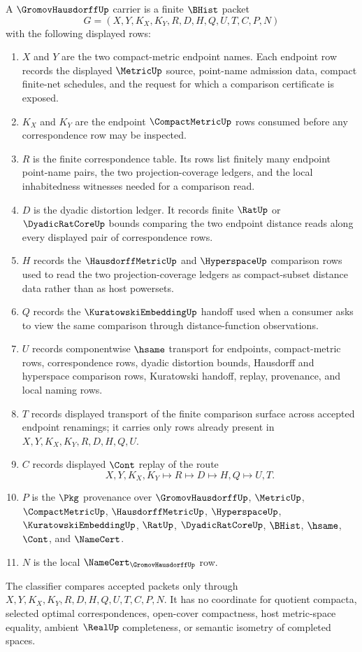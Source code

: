 \begin{definition}
\label{def:gromov-hausdorff-carrier}
A $\GromovHausdorffUp$ carrier is a finite $\BHist$ packet
$$
G=(X,Y,K_X,K_Y,R,D,H,Q,U,T,C,P,N)
$$
with the following displayed rows:
\begin{enumerate}
\item $X$ and $Y$ are the two compact-metric endpoint names. Each endpoint row records the displayed $\MetricUp$ source, point-name admission data, compact finite-net schedules, and the request for which a comparison certificate is exposed.
\item $K_X$ and $K_Y$ are the endpoint $\CompactMetricUp$ rows consumed before any correspondence row may be inspected.
\item $R$ is the finite correspondence table. Its rows list finitely many endpoint point-name pairs, the two projection-coverage ledgers, and the local inhabitedness witnesses needed for a comparison read.
\item $D$ is the dyadic distortion ledger. It records finite $\RatUp$ or $\DyadicRatCoreUp$ bounds comparing the two endpoint distance reads along every displayed pair of correspondence rows.
\item $H$ records the $\HausdorffMetricUp$ and $\HyperspaceUp$ comparison rows used to read the two projection-coverage ledgers as compact-subset distance data rather than as host powersets.
\item $Q$ records the $\KuratowskiEmbeddingUp$ handoff used when a consumer asks to view the same comparison through distance-function observations.
\item $U$ records componentwise $\hsame$ transport for endpoints, compact-metric rows, correspondence rows, dyadic distortion bounds, Hausdorff and hyperspace comparison rows, Kuratowski handoff, replay, provenance, and local naming rows.
\item $T$ records displayed transport of the finite comparison surface across accepted endpoint renamings; it carries only rows already present in $X,Y,K_X,K_Y,R,D,H,Q,U$.
\item $C$ records displayed $\Cont$ replay of the route
$$
X,Y,K_X,K_Y \longmapsto R \longmapsto D \longmapsto H,Q \longmapsto U,T .
$$
\item $P$ is the $\Pkg$ provenance over $\GromovHausdorffUp$, $\MetricUp$, $\CompactMetricUp$, $\HausdorffMetricUp$, $\HyperspaceUp$, $\KuratowskiEmbeddingUp$, $\RatUp$, $\DyadicRatCoreUp$, $\BHist$, $\hsame$, $\Cont$, and $\NameCert$.
\item $N$ is the local $\NameCert_{\GromovHausdorffUp}$ row.
\end{enumerate}
The classifier compares accepted packets only through $X,Y,K_X,K_Y,R,D,H,Q,U,T,C,P,N$. It has no coordinate for quotient compacta, selected optimal correspondences, open-cover compactness, host metric-space equality, ambient $\RealUp$ completeness, or semantic isometry of completed spaces.
\end{definition}

